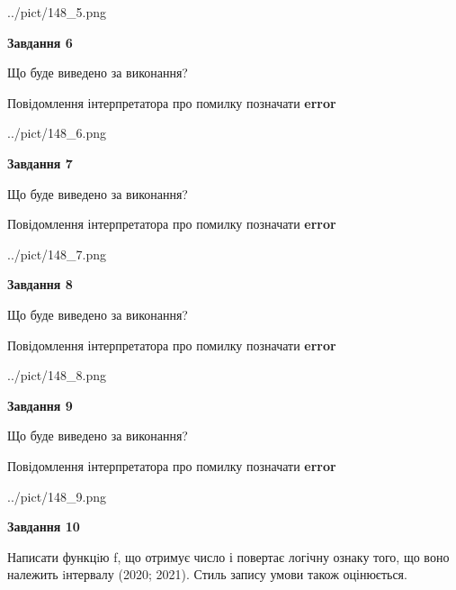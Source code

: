 \documentclass[12pt, ukrainian]{article}
\begin{document}
{\begin {large}
\begin{center}
	{../pict/148_5.png}
\end{center}
\newpage

{\begin {center}\textbf{Завдання 6}\end {center}}\par
Що буде виведено за виконання? \par
Повідомлення інтерпретатора про помилку позначати \textbf{error}

\begin{center}
	{../pict/148_6.png}
\end{center}
\newpage

{\begin {center}\textbf{Завдання 7}\end {center}}\par
Що буде виведено за виконання? \par
Повідомлення інтерпретатора про помилку позначати \textbf{error}

\begin{center}
	{../pict/148_7.png}
\end{center}
\newpage

{\begin {center}\textbf{Завдання 8}\end {center}}\par
Що буде виведено за виконання? \par
Повідомлення інтерпретатора про помилку позначати \textbf{error}

\begin{center}
	{../pict/148_8.png}
\end{center}
\newpage

{\begin {center}\textbf{Завдання 9}\end {center}}\par
Що буде виведено за виконання? \par
Повідомлення інтерпретатора про помилку позначати \textbf{error}

\begin{center}
	{../pict/148_9.png}
\end{center}
\newpage

{\begin {center}\textbf{Завдання 10}\end {center}}\par

Написати функцiю f, що отримує число і повертає логічну ознаку того, що воно належить iнтервалу (2020; 2021). Стиль запису умови також оцінюється.\par
\newpage

\end {large}}
\end{document}
